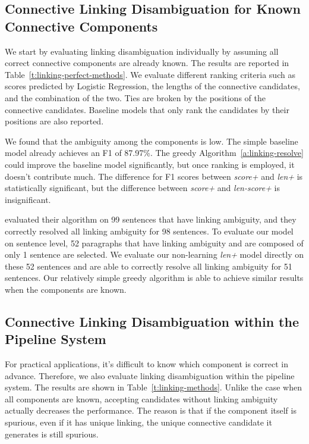 \subsection{Connective Linking Disambiguation for Known Connective Components}

We start by evaluating linking disambiguation individually by assuming all correct
connective components are already known. The results are reported in
Table~\ref{t:linking-perfect-methods}.
We evaluate different ranking criteria such as scores predicted by
Logistic Regression, the lengths of the connective candidates, and the combination
of the two. Ties are broken by the positions of the connective candidates.
Baseline models that only rank the candidates by their positions are also reported.

We found that the ambiguity among the components is low. The simple
baseline model already achieves an F1 of 87.97\%. The greedy
Algorithm~\ref{a:linking-resolve} could improve the baseline
model significantly, but once ranking is employed, it doesn't contribute much.
The difference for F1 scores between \textit{score+} and \textit{len+} is statistically
significant, but the difference between \textit{score+} and \textit{len-score+}
is insignificant.




\cite{hu2011research} evaluated their algorithm on 99 sentences that have
linking ambiguity, and they correctly resolved all linking ambiguity for 98
sentences. To evaluate our model on sentence level, 52 paragraphs that have linking ambiguity
and are composed of only 1 sentence are selected. We evaluate our non-learning \textit{len+} model
directly on these 52 sentences and are able to correctly resolve all linking
ambiguity for 51 sentences. Our relatively simple greedy algorithm is
able to achieve similar results when the components are known.

\subsection{Connective Linking Disambiguation within the Pipeline System}

For practical applications, it's difficult to know which component is correct in
advance. Therefore, we also evaluate linking disambiguation within the pipeline
system. The results are shown in Table~\ref{t:linking-methods}. Unlike the case
when all components are known, accepting candidates without linking ambiguity actually
decreases the performance. The reason is that if the component itself is spurious,
even if it has unique linking, the unique connective candidate it generates
is still spurious.


